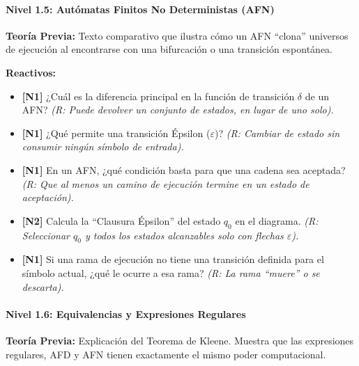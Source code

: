 \paragraph{Nivel 1.5: Autómatas Finitos No Deterministas (AFN)}

\textbf{Teoría Previa:} Texto comparativo que ilustra cómo un AFN ``clona'' universos de ejecución
al encontrarse con una bifurcación o una transición espontánea.

\textbf{Reactivos:}
\begin{itemize}
    \item \textbf{[N1]} ¿Cuál es la diferencia principal en la función de transición $\delta$ de un
    AFN? \textit{(R: Puede devolver un conjunto de estados, en lugar de uno solo).}
    \item \textbf{[N1]} ¿Qué permite una transición Épsilon ($\varepsilon$)? \textit{(R: Cambiar
    de estado sin consumir ningún símbolo de entrada).}
    \item \textbf{[N1]} En un AFN, ¿qué condición basta para que una cadena sea aceptada?
    \textit{(R: Que al menos un camino de ejecución termine en un estado de aceptación).}
    \item \textbf{[N2]} Calcula la ``Clausura Épsilon'' del estado $q_0$ en el diagrama. \textit{(R:
    Seleccionar $q_0$ y todos los estados alcanzables solo con flechas $\varepsilon$).}
    \item \textbf{[N1]} Si una rama de ejecución no tiene una transición definida para el símbolo
    actual, ¿qué le ocurre a esa rama? \textit{(R: La rama ``muere'' o se descarta).}
\end{itemize}

\paragraph{Nivel 1.6: Equivalencias y Expresiones Regulares}

\textbf{Teoría Previa:} Explicación del Teorema de Kleene. Muestra que las expresiones regulares,
AFD y AFN tienen exactamente el mismo poder computacional.

